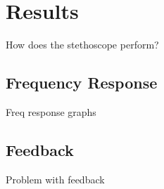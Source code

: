 \chapter{Results} \label{results}

How does the stethoscope perform?

\section{Frequency Response}
Freq response graphs

\section{Feedback} \label{feedback-freq}
Problem with feedback